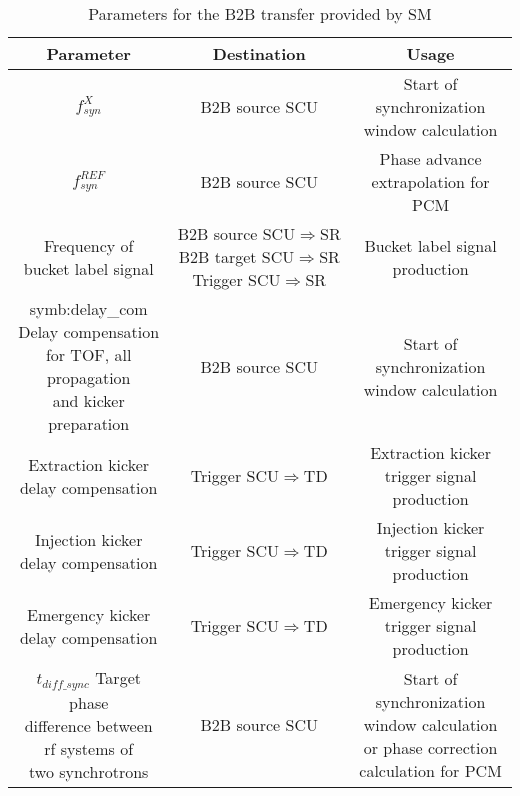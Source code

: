 \label{parameter_SM}
\begin{landscape} 
\begin{table}[!htb]

\caption{Parameters for the B2B transfer provided by SM}
\label{requirement}
\begin{center}
    \begin{tabular}{ | c | c | c |}
    \hline
\rowcolor[gray]{0.5}
     	Parameter &Destination & Usage  \\ \hline
$f_{\mathit{syn}}^X $							&	B2B source SCU	&	Start of synchronization window calculation\\ \hline
$f_{\mathit{syn}}^\mathit{REF} 	$			&	B2B source SCU	&	Phase advance extrapolation for PCM	\\ \hline
\tabincell{c}{Frequency of\\ bucket label signal} 			&	\tabincell{c}{B2B source SCU$\Rightarrow$SR\\B2B target SCU$\Rightarrow$SR\\Trigger SCU$\Rightarrow$SR}& Bucket label signal production\\ \hline
\tabincell{c}{\gls{symb:delay_com} Delay compensation\\ for TOF, all propagation\\ and kicker preparation}	&	B2B source SCU	& Start of synchronization window calculation\\ \hline
\tabincell{c}{Extraction kicker \\delay compensation}&		Trigger SCU$\Rightarrow$TD			&Extraction kicker trigger signal production	\\ \hline
\tabincell{c}{Injection kicker \\delay compensation} &		Trigger SCU$\Rightarrow$TD			&Injection kicker trigger signal production\\ \hline
\tabincell{c}{Emergency kicker \\delay compensation} &		Trigger SCU$\Rightarrow$TD			&Emergency kicker trigger signal production\\ \hline
$t_{\mathit{diff\_sync}}$ \tabincell{c}{Target phase \\difference between\\ rf systems of\\ two synchrotrons}							&		B2B source SCU	&\tabincell{c}{Start of synchronization window calculation \\ or phase correction calculation for PCM} \\ \hline

\end{tabular}
\end{center}
\end{table}
\end{landscape}
